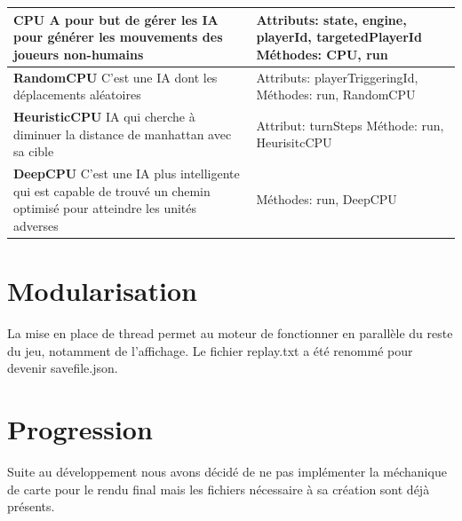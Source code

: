 \begin{tabularx}{15 cm}{|X|X|}
\hline
\textbf{CPU} \newline A pour but de gérer les IA pour générer les mouvements des joueurs non-humains & Attributs: state, engine, playerId, targetedPlayerId   \newline Méthodes: CPU, run\\ 
\hline
\textbf{RandomCPU} \newline C'est une IA dont les déplacements aléatoires & Attributs: playerTriggeringId,  \newline Méthodes: run, RandomCPU\\
\hline
\textbf{HeuristicCPU} \newline IA qui cherche à diminuer la distance de manhattan avec sa cible & Attribut: turnSteps \newline Méthode: run, HeurisitcCPU\\
\hline
\textbf{DeepCPU} \newline C'est une IA plus intelligente qui est capable de trouvé un chemin optimisé pour atteindre les unités adverses & 
\newline Méthodes: run, DeepCPU\\
\hline

\end{tabularx}





\section{Modularisation}

La mise en place de thread permet au moteur de fonctionner en parallèle du reste du jeu, notamment de l'affichage.
Le fichier replay.txt a été renommé pour devenir savefile.json.

\section{Progression}

Suite au développement nous avons décidé de ne pas implémenter la méchanique de carte pour le rendu final mais les fichiers nécessaire à sa création sont déjà présents.








